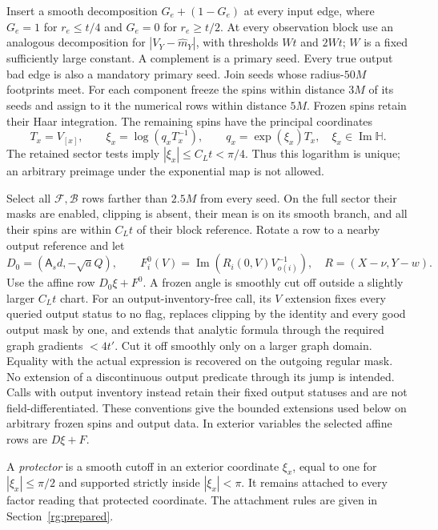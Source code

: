 Insert a smooth decomposition $G_e+(1-G_e)$ at every input edge,
where $G_e=1$ for $r_e\le t/4$ and $G_e=0$ for $r_e\ge t/2$.
At every observation block use an analogous decomposition for
$|V_Y-\widehat m_Y|$, with thresholds $Wt$ and $2Wt$; $W$ is a
fixed sufficiently large constant.  A complement is a primary seed.
Every true output bad edge is also a mandatory primary seed.  Join
seeds whose radius-$50M$ footprints meet.  For each component freeze
the spins within distance $3M$ of its seeds and assign to it the
numerical rows within distance $5M$.  Frozen spins retain their Haar
integration.  The remaining spins have the principal coordinates
\[
 T_x=V_{[x]},\qquad \xi_x=\log(q_xT_x^{-1}),\qquad
 q_x=\exp(\xi_x)T_x,
 \quad \xi_x\in\operatorname{Im}\mathbb H.
\]
The retained sector tests imply $|\xi_x|\le C_Lt<\pi/4$.
Thus this logarithm is unique; an arbitrary preimage under the
exponential map is not allowed.

Select all $\mathcal F,\mathcal B$ rows farther than $2.5M$ from
every seed.  On the full sector their masks are enabled, clipping is
absent, their mean is on its smooth branch, and all their spins are
within $C_Lt$ of their block reference.  Rotate a row to a nearby
output reference and let
\[
 D_0=(\mathsf A_s d,-\sqrt aQ),\qquad
 F_i^0(V)=\operatorname{Im}(R_i(0,V)V_{o(i)}^{-1}),
 \quad R=(X-\nu,Y-w).
\]
Use the affine row $D_0\xi+F^0$.  A frozen angle is smoothly cut off
outside a slightly larger $C_Lt$ chart.  For an output-inventory-free
call, its $V$ extension fixes every queried output status to no flag,
replaces clipping by the identity and every good output mask by one,
and extends that analytic formula through the required graph gradients
$<4t'$.  Cut it off smoothly only on a larger graph domain.  Equality
with the actual expression is recovered on the outgoing regular mask.
No extension of a discontinuous output predicate through its jump is
intended.  Calls with output inventory instead retain their fixed output
statuses and are not field-differentiated.  These conventions give the
bounded extensions used below on arbitrary frozen spins and output data.
In exterior variables the selected affine rows are $D\xi+F$.

A \emph{protector} is a smooth cutoff in an exterior coordinate $\xi_x$,
equal to one for $|\xi_x|\le\pi/2$ and supported strictly inside
$|\xi_x|<\pi$. It remains attached to every factor reading that protected
coordinate. The attachment rules are given in Section~\ref{rg:prepared}.

